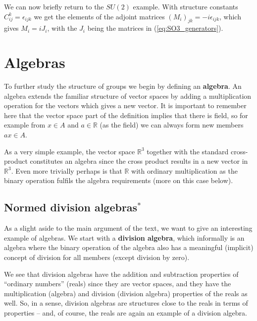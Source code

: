 \documentclass[notes.tex]{subfiles}
\begin{document}
We can now briefly return to the $SU(2)$ example. With structure constants $C^k_{ij}=\epsilon_{ijk}$ we get the elements of the adjoint matrices $(M_i)_{jk} =-i\epsilon_{ijk}$, which gives $M_i=iJ_i$, with the $J_i$ being the matrices in (\ref{eq:SO3_generators}). 


\section{Algebras}
\label{sec:algebras}

To further study the structure of groups we begin by defining an {\bf algebra}. An algebra extends the familiar structure of vector spaces by adding a multiplication operation for the vectors which gives a new vector.
It is important to remember here that the vector space part of the definition implies that there is field, so for example from $x\in A$ and $a\in \mathbb{R}$ (as the field) we can always form new members $ax\in A$.

As a very simple example, the vector space $\mathbb{R}^3$ together with the standard cross-product constitutes an algebra since the cross product results in a new vector in  $\mathbb{R}^3$. Even more trivially perhaps is that $\mathbb{R}$ with ordinary multiplication as the binary operation fulfils the algebra requirements (more on this case below).

\subsection{Normed division algebras$^*$}
\label{sec:normed_division_algebras}
As a slight aside to the main argument of the text, we want to give an interesting example of algebras. We start with a {\bf division algebra}, which informally is an algebra where the binary operation of the algebra also has a meaningful (implicit) concept of division for all members (except division by zero).

We see that division algebras have the addition and subtraction properties of ``ordinary numbers'' (reals) since they are vector spaces, and they have the  multiplication (algebra) and division (division algebra) properties of the reals as well. So, in a sense, division algebras are structures close to the reals in terms of properties -- and, of course, the reals are again an example of a division algebra. 
\end{document}
